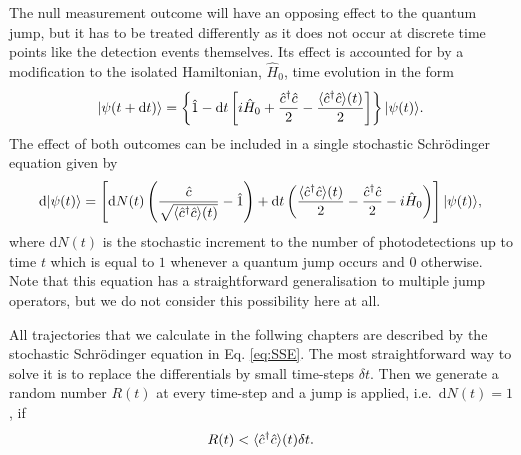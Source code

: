The null measurement outcome will have an opposing effect to the
quantum jump, but it has to be treated differently as it does not
occur at discrete time points like the detection events
themselves. Its effect is accounted for by a modification to the
isolated Hamiltonian, $\hat{H}_0$, time evolution in the form
\begin{equation}
  | \psi (t + \mathrm{d}t) \rangle = \left\{ \hat{1} - \mathrm{d}t
    \left[ i \hat{H}_0 + \frac{\hat{c}^\dagger \hat{c}}{2} - \frac{\langle \hat{c}^\dagger \hat{c}
        \rangle (t)}{2} \right] \right\} | \psi (t) \rangle.
\end{equation}
The effect of both outcomes can be included in a single stochastic
Schr\"{o}dinger equation given by
\begin{equation}
  \label{eq:SSE}
  \mathrm{d} | \psi(t) \rangle = \left[ \mathrm{d} N(t) \left(
      \frac{\hat{c}} {\sqrt{ \langle \hat{c}^\dagger \hat{c} \rangle (t)}} - \hat{1} \right)
    + \mathrm{d} t \left( \frac{\langle \hat{c}^\dagger \hat{c} \rangle (t)}{2} -
      \frac{ \hat{c}^\dagger \hat{c}}{2} - i \hat{H}_0 \right) \right] | \psi(t) \rangle,
\end{equation}
where $\mathrm{d}N(t)$ is the stochastic increment to the number of
photodetections up to time $t$ which is equal to $1$ whenever a
quantum jump occurs and $0$ otherwise. Note that this equation has a
straightforward generalisation to multiple jump operators, but we do
not consider this possibility here at all.

All trajectories that we calculate in the follwing chapters are
described by the stochastic Schr\"{o}dinger equation in
Eq. \eqref{eq:SSE}. The most straightforward way to solve it is to
replace the differentials by small time-steps $\delta t$. Then we
generate a random number $R(t)$ at every time-step and a jump is
applied, i.e.~$\mathrm{d}N(t) = 1$, if
\begin{equation}
  R(t) < \langle \hat{c}^\dagger \hat{c} \rangle (t) \delta t.
\end{equation}

